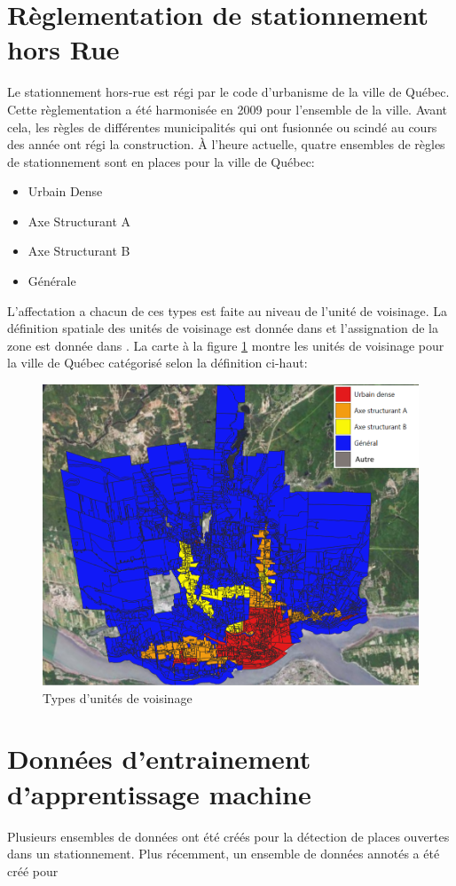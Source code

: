 \section{Règlementation de stationnement hors Rue}
  Le stationnement hors-rue est régi par le code d'urbanisme de la ville de Québec. Cette règlementation a été harmonisée en 2009 pour l'ensemble de la ville. Avant cela, les règles de différentes municipalités qui ont fusionnée ou scindé au cours des année ont régi la construction. À l'heure actuelle, quatre ensembles de règles de stationnement sont en places pour la ville de Québec:
  \begin{itemize}
    \item Urbain Dense 
    \item Axe Structurant A
    \item Axe Structurant B
    \item Générale
  \end{itemize}
  L'affectation a chacun de ces types est faite au niveau de l'unité de voisinage. La définition spatiale des unités de voisinage est donnée dans \textcite{VilledeQuebec:ZonageMunicipal:2024} et l'assignation de la zone est donnée dans \textcite{VilledeQuebec:GrilleSpecifications:2024}. La carte à la figure \ref{fig:types_unites_voisinage} montre les unités de voisinage pour la ville de Québec catégorisé selon la définition ci-haut:
  \begin{figure}
    \centering
    \includegraphics[width=0.5\linewidth]{images/Types_unites_voisinage.png}
    \caption{Types d'unités de voisinage}
    \label{fig:types_unites_voisinage}
  \end{figure}
  \FloatBarrier
\section{Données d'entrainement d'apprentissage machine}
Plusieurs ensembles de données ont été créés pour la détection de places ouvertes dans un stationnement. Plus récemment, un ensemble de données annotés a été créé pour 
